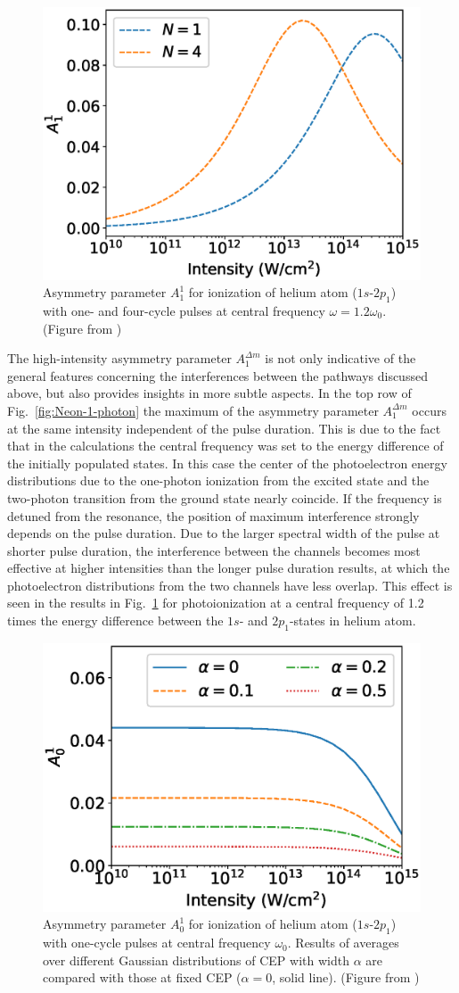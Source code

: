 \begin{figure}[!ht]
\centering
\includegraphics[width=.45\linewidth]{figs/Photo_ionization/GAP/He_2p1_detune_1p2.eps}
\caption{ 
Asymmetry parameter $A_1^1$ for ionization of helium atom ($1s$-$2p_1$) with one- and four-cycle pulses at central frequency 
$\omega=1.2\omega_0$. (Figure from \cite{venzke2020_GAP})
} 
  \label{fig:detuned_GAP}
\end{figure}

The high-intensity asymmetry parameter $A_1^{\Delta m}$ is not only indicative of the general features concerning the interferences between the pathways discussed above, but also provides insights in more subtle aspects. In the top row of Fig.~\ref{fig:Neon-1-photon} the maximum of the asymmetry parameter $A_1^{\Delta m}$ occurs at the same intensity independent of the pulse duration. This is due to the fact that in the calculations the central frequency was set to the energy difference of the initially populated states. In this case the center of the photoelectron energy distributions due to the one-photon ionization from the excited state and the two-photon transition from the ground state nearly coincide. If the frequency is detuned from the resonance, the position of maximum interference strongly depends on the pulse duration. Due to the larger spectral width of the pulse at shorter pulse duration, the interference between the channels becomes most effective at higher intensities than the longer pulse duration results, at which the photoelectron distributions from the two channels have less overlap. This effect is seen in the results in Fig.\ \ref{fig:detuned_GAP} for photoionization at a central frequency of 1.2 times the energy difference between the $1s$- and $2p_1$-states in helium atom. 

\begin{figure}[!ht]
\centering
\includegraphics[width=.45\linewidth]{figs/Photo_ionization/GAP/He_2p1_asym_alpha.eps}
\caption{
Asymmetry parameter $A_0^1$ for ionization of helium atom ($1s$-$2p_1$) with one-cycle pulses at central frequency $\omega_0$. Results of averages over different Gaussian distributions of CEP with width $\alpha$ are compared with those at fixed CEP ($\alpha =0$, solid line). (Figure from \cite{venzke2020_GAP})
} 
  \label{fig:cep_avg}
\end{figure}

